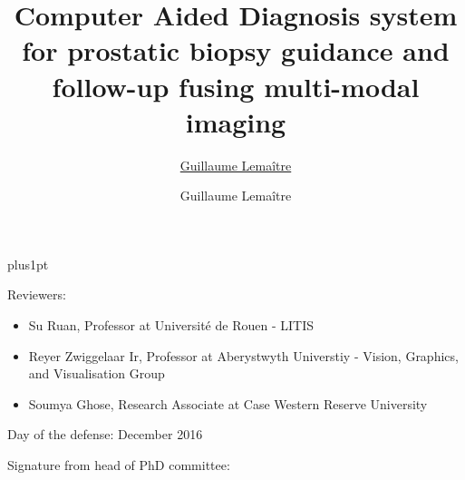 \documentclass[twoside,12pt]{Latex/Classes/PhDthesisPSnPDF}
\title{Computer Aided Diagnosis system for prostatic biopsy guidance and follow-up fusing multi-modal imaging}
\author{\href{mailto:guillaume.lemaitre@udg.edu}{Guillaume Lema\^itre}}
\author{Guillaume Lema\^itre}
\begin{document}

\renewcommand\baselinestretch{1.2}
\baselineskip=18pt plus1pt



\maketitle  %



\newpage
\vspace{10mm}
Reviewers:

\begin{itemize}
\item[] Su Ruan, Professor at Universit\'e de Rouen - LITIS
\item[] Reyer Zwiggelaar Ir, Professor at Aberystwyth Universtiy - Vision, Graphics, and Visualisation Group
\item[] Soumya Ghose, Research Associate at Case Western Reserve University
\end{itemize}

\vspace{20mm}
Day of the defense: December 2016

\vspace{20mm}
\hspace{70mm}Signature from head of PhD committee:







%  
\end{document}
